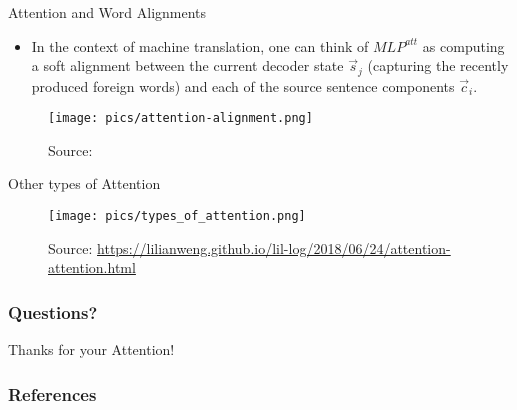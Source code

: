 \documentclass[handout]{beamer}
\begin{document}
\begin{frame}{Attention and Word Alignments}
\begin{scriptsize}
\begin{itemize}
\item In the context of machine translation, one can think of $MLP^{att}$ as computing a soft alignment between the current decoder state $\vec{s}_j$ (capturing the recently produced foreign words) and each of the source sentence components $\vec{c}_i$.


\end{itemize}


         \begin{figure}[h]
        	\texttt{[image: pics/attention-alignment.png]}
        	\caption{Source: \cite{cho2015describing}}
        \end{figure}  


\end{scriptsize}
\end{frame}



\begin{frame}{Other types of Attention}
\begin{scriptsize}

       \begin{figure}[h]
        	\texttt{[image: pics/types\_of\_attention.png]}
        	\caption{Source: \url{https://lilianweng.github.io/lil-log/2018/06/24/attention-attention.html}}
        \end{figure}  


\end{scriptsize}
\end{frame}


\begin{frame}
\frametitle{Questions?}
\begin{center}\LARGE Thanks for your Attention!\\ \end{center}



\end{frame}

\begin{frame}[allowframebreaks]\scriptsize
\frametitle{References}


%
\end{frame}  


\end{document}
